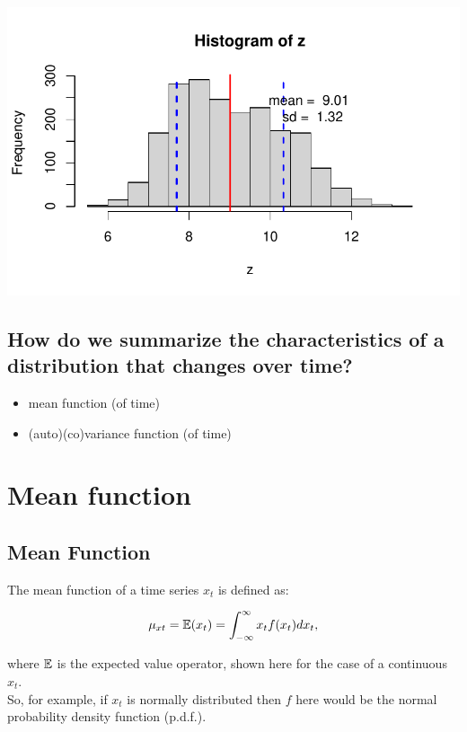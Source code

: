 \documentclass[
  letterpaper,
  DIV=11,
  numbers=noendperiod]{scrreprt}
\begin{document}
\includegraphics{LectureNotes/Lecture2_files/figure-pdf/unnamed-chunk-9-1.pdf}

\section{How do we summarize the characteristics of a distribution that
changes over
time?}\label{how-do-we-summarize-the-characteristics-of-a-distribution-that-changes-over-time}

\begin{itemize}
\item
  mean function (of time)
\item
  (auto)(co)variance function (of time)
\end{itemize}

\chapter{Mean function}\label{mean-function}

\section{Mean Function}\label{mean-function-1}

The mean function of a time series \(x_t\) is defined as:

\[
\mu_{xt} = {\mathbb{E}}(x_t) = \int_{-\infty}^\infty x_tf(x_t)dx_t,
\]

where \({\mathbb{E}}\) is the expected value operator, shown here for the case of
a continuous \(x_t\).\\

So, for example, if \(x_t\) is normally distributed then \(f\) here
would be the normal probability density function (p.d.f.).
\end{document}
